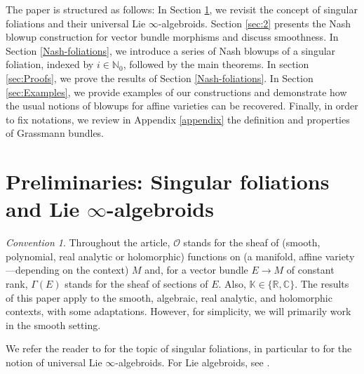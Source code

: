 \documentclass[10pt]{article}
\theoremstyle{plain}
\theoremstyle{definition}
\theoremstyle{remark}
\newtheorem{convention}[lemma]{Convention}
\newcommand{\dd}{\mathrm{d}}
\begin{document}



The paper is structured as follows: In Section \ref{sec:1}, we revisit the concept of singular foliations and their universal Lie $\infty$-algebroids. Section \ref{sec:2} presents the Nash blowup construction for  vector bundle morphisms and discuss smoothness. In Section \ref{Nash-foliations}, we introduce a series of Nash blowups of a singular foliation, indexed by $i\in \mathbb N_0$, followed by the main theorems. In  section \ref{sec:Proofs}, we prove the results of Section \ref{Nash-foliations}. In Section \ref{sec:Examples}, we provide examples of our constructions and demonstrate how the usual notions of blowups for affine varieties can be recovered. Finally, in order to fix notations,  we review in Appendix \ref{appendix} the definition and properties of Grassmann bundles.

\section{Preliminaries: Singular foliations and Lie $\infty$-algebroids}\label{sec:1}
\begin{convention}
 Throughout the article, $\mathcal O$ stands for the sheaf of (smooth, polynomial,
real analytic or holomorphic) functions on (a manifold, affine variety—depending on the context) $M$ and, for a vector
bundle $E\to M$ of constant rank, $\Gamma(E)$ stands for the sheaf of sections of $E$. Also, $\mathbb K\in \{\mathbb R,\mathbb C\}$. The results of this paper apply to the smooth, algebraic, real analytic, and holomorphic contexts, with some adaptations. However, for simplicity, we will primarily work in the smooth setting.
\end{convention}


 
We refer the reader to \cite{AndroulidakisIakovos,AndroulidakisZambon,Cerveau, Debord,LLS,LLL} for the topic of singular foliations, in particular to \cite{LLS, CLRL} for the notion of universal Lie $\infty$-algebroids. For Lie algebroids, see \cite{Mackenzie-Kirill}.
\end{document}
